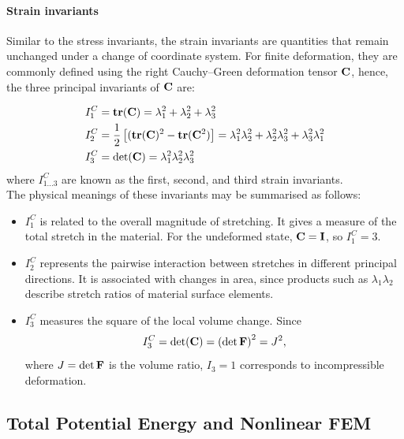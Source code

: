 \documentclass[12pt, a4paper]{article}
\numberwithin{equation}{section}
\begin{document}
\paragraph{Strain invariants} Similar to the stress invariants, the strain invariants are quantities that remain unchanged under a change of coordinate system. For finite deformation, they are commonly defined using the right Cauchy--Green deformation tensor $\mathbf{C}$, hence, the three principal invariants of $\mathbf{C}$ are:

\begin{align}
\label{eqn:inv1_strain}
    I_1^C & = \mathbf{tr} (\mathbf{C}) = \lambda_1^2 + \lambda_2^2 + \lambda_3^2 \\
\label{eqn:inv2_strain}
    I_2^C & = \frac{1}{2} \left[ (\mathbf{tr} (\mathbf{C})^2 - \mathbf{tr} (\mathbf{C}^2) \right] = \lambda_1^2 \lambda_2^2 + \lambda_2^2 \lambda_3^2 + \lambda_3^2 \lambda_1^2\\
\label{eqn:inv3_strain}
    I_3^C & = \det (\mathbf{C}) = \lambda_1^2 \lambda_2^2 \lambda_3^2
\end{align}
where $I_{1...3}^C$ are known as the first, second, and third strain invariants. \\

The physical meanings of these invariants may be summarised as follows:
\begin{itemize}
    \item $I_1^C$ is related to the overall magnitude of stretching. It gives a measure of the total stretch in the material. For the undeformed state, $\mathbf{C} = \mathbf{I}$, so $I_1^C = 3$.

    \item $I_2^C$ represents the pairwise interaction between stretches in different principal directions. It is associated with changes in area, since products such as $\lambda_1\lambda_2$ describe stretch ratios of material surface elements.

    \item $I_3^C$ measures the square of the local volume change. Since
    \[
        I_3^C = \det(\mathbf{C}) = \left(\det \mathbf{F}\right)^2 = J^2,
    \]
    where $J=\det\mathbf{F}$ is the volume ratio, $I_3=1$ corresponds to incompressible deformation.
\end{itemize}




\newpage
\subsection{Total Potential Energy and Nonlinear FEM}
\end{document}
